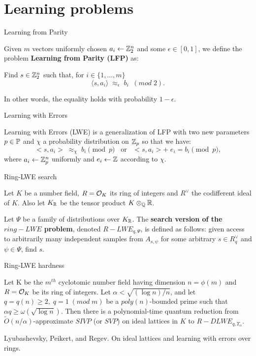 \documentclass[notheorems, bigger]{beamer}
\begin{document}
\section{Learning problems}
\label{sec:org12dc3ac}
\begin{frame}[label={sec:org3cacdee}]{Learning from Parity}
\begin{text}
  Given $m$ vectors uniformly chosen  $a_i \gets \Z^n_2$ and some $\epsilon \in [0,1]$, we
  define the problem \textbf{Learning from Parity (LFP)} as:

  Find $s \in \Z^n_2$ such that, for $i \in \{1,\dots,m\}$
  $$ \langle{s, a_i}\rangle \; \approx_\epsilon \; b_i \;\; (mod\; 2). $$

  In other words, the equality holds with probability $1 - \epsilon$.
\end{text}
\end{frame}
\begin{frame}[label={sec:org004f0e6}]{Learning with Errors}
\begin{text}
Learning with Errors (LWE) is a generalization of LFP  with two new parameters
$p \in \P$ and $\chi$ a probability distribution on $\Z_p$ so that we have:
\[
  <s, a_i> \; \approx_\chi \; b_i \pmod p \;\;\; \text{or} \;\;\; <s, a_i> + \; e_i =  b_i \pmod p ,
\]
where $a_i \gets \Z^n_p$ uniformly and $e_i \gets \Z$ according to $\chi$.
\end{text}
\end{frame}
\begin{frame}[label={sec:org9010551}]{Ring-LWE search}
\begin{text}
  Let $K$ be a number field, $R = \Ok$ its ring of integers and $R^\vee$ the
  codifferent ideal of $K$. Also let $K_\R$ be the tensor product $K \otimes_\Q \R$.


  Let $\Psi$ be a family of distributions over $K_\R$. The \textbf{search version of the $ring-LWE$ problem}, denoted $R-LWE_{q,\Psi}$, is defined as follows: given access to arbitrarily many independent samples from $A_{s,\psi}$ for some arbitrary $s \in R_q^\vee$ and $\psi \in \Psi$, find $s$.
\end{text}
\end{frame}
\begin{frame}[label={sec:org69f0bbe}]{Ring-LWE hardness}
\begin{text}

  \begin{theorem}
    Let K be the $m^{th}$ cyclotomic number field having dimension $n = \phi(m)$ and $R =
    \Ok$ be its ring of integers. Let $\alpha < \sqrt{(\log{n})/n}$, and let $q = q(n)
    \geq 2, \; q = 1 \; (mod \; m)$ be a $poly(n)$-bounded prime such that $\alpha q \geq
    \omega(\sqrt{\log{n}})$. Then there is a polynomial-time quantum reduction from
    $\tilde{O}(n/\alpha)$-approximate $SIVP$ (or $SVP$) on ideal lattices in $K$ to
    $R-DLWE_{q,\Upsilon_\alpha}$.
  \end{theorem}


  \tiny Lyubashevsky, Peikert, and Regev. On ideal lattices and learning with errors over rings.
\end{text}
\end{frame}
\end{document}
